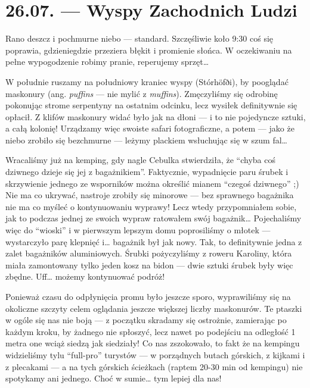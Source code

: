 \chapter*{26.07. --- Wyspy Zachodnich Ludzi}

Rano deszcz i pochmurne niebo --- standard. Szczęśliwie koło 9:30 coś się poprawia, gdzieniegdzie przeziera błękit i promienie słońca. W oczekiwaniu na pełne wypogodzenie robimy pranie, reperujemy sprzęt…


W południe ruszamy na południowy kraniec wyspy (Stórhöfði), by pooglądać maskonury (ang. \emph{puffins} --- nie mylić z \emph{muffins}). Zmęczyliśmy się odrobinę pokonując strome serpentyny na ostatnim odcinku, lecz wysiłek definitywnie się opłacił. Z klifów maskonury widać było jak na dłoni --- i to nie pojedyncze sztuki, a całą kolonię! Urządzamy więc swoiste safari fotograficzne, a potem --- jako że niebo zrobiło się bezchmurne --- leżymy plackiem wsłuchując się w szum fal…

Wracaliśmy już na kemping, gdy nagle Cebulka stwierdziła, że “chyba coś dziwnego dzieje się jej z bagażnikiem”. Faktycznie, wypadnięcie paru śrubek i skrzywienie jednego ze wsporników można określić mianem “czegoś dziwnego” ;) Nie ma co ukrywać, nastroje zrobiły się minorowe --- bez sprawnego bagażnika nie ma co myśleć o kontynuowaniu wyprawy! Lecz wtedy przypomniałem sobie, jak to podczas jednej ze swoich wypraw ratowałem swój bagażnik… Pojechaliśmy więc do “wioski” i  w pierwszym lepszym domu poprosiliśmy o młotek --- wystarczyło parę klepnięć i… bagażnik był jak nowy. Tak, to definitywnie jedna z zalet bagażników aluminiowych. Śrubki pożyczyliśmy z roweru Karoliny, która miała zamontowany tylko jeden kosz na bidon --- dwie sztuki śrubek były więc zbędne. Uff… możemy kontynuować podróż!

Ponieważ czasu do odpłynięcia promu było jeszcze sporo, wyprawiliśmy się na okoliczne szczyty celem oglądania jeszcze większej liczby maskonurów. Te ptaszki w ogóle się nas nie boją --- z początku skradamy się ostrożnie, zamierając po każdym kroku, by żadnego nie spłoszyć, lecz nawet po podejściu na odległość 1 metra one wciąż siedzą jak siedziały! Co nas zszokowało, to fakt że na kempingu widzieliśmy tylu “full-pro” turystów --- w porządnych butach górskich, z kijkami i z plecakami --- a na tych górskich ścieżkach (raptem 20-30 min od kempingu) nie spotykamy ani jednego. Choć w sumie… tym lepiej dla nas!

